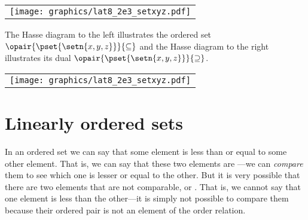 %  
\begin{tabular}{c}%
  \texttt{[image: graphics/lat8\_2e3\_setxyz.pdf]}%
\end{tabular}
\hfill%
\begin{minipage}{\tw-85mm}\raggedright
\begin{example}
The Hasse diagram to the left illustrates the ordered set 
$\opair{\pset{\setn{x,y,z}}}{\subseteq}$
and the Hasse diagram to the right illustrates its dual
$\opair{\pset{\setn{x,y,z}}}{\supseteq}$.
\end{example}
\end{minipage}%
\hfill
\begin{tabular}{c}%
  \texttt{[image: graphics/lat8\_2e3\_setxyz.pdf]}%
\end{tabular}
%  







\section{Linearly ordered sets}

In an ordered set we can say that some element
is less than or equal to some other element.
That is, we can say that these two elements are ---we 
can \emph{compare} them to see which one is lesser or equal to
the other.
But it is very possible that there are two elements
that are not comparable, or .
That is, we cannot say that one element is less than the other---it is 
simply not possible to compare them because their ordered pair is not 
an element of the order relation.

